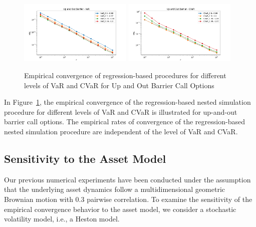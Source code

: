 \begin{figure}[ht!] 
    \centering
    \includegraphics[width=0.48\textwidth]{./project1/figures/figure9a.png}
    \includegraphics[width=0.48\textwidth]{./project1/figures/figure9b.png}
    \caption{Empirical convergence of regression-based procedures for different levels of VaR and CVaR for Up and Out Barrier Call Options}
    \label{fig1:sens_level}
\end{figure}

In Figure~\ref{fig1:sens_level}, the empirical convergence of the regression-based nested simulation procedure for different levels of VaR and CVaR is illustrated for up-and-out barrier call options.
The empirical rates of convergence of the regression-based nested simulation procedure are independent of the level of VaR and CVaR.

\subsection{Sensitivity to the Asset Model} \label{sec1:sensitivity-assetModel}

Our previous numerical experiments have been conducted under the assumption that the underlying asset dynamics follow a multidimensional geometric Brownian motion with $0.3$ pairwise correlation.
To examine the sensitivity of the empirical convergence behavior to the asset model, we consider a stochastic volatility model, i.e., a Heston model.

